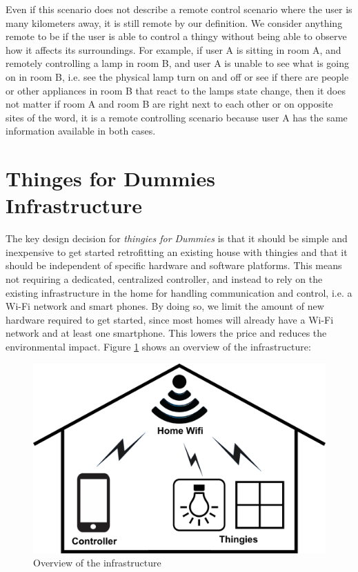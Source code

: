 \documentclass{ubicomp2012}
\begin{document}
Even if this scenario does not describe a remote control scenario where the user is many kilometers away, it is still remote by our definition. We consider anything remote to be if the user is able to control a thingy without being able to observe how it affects its surroundings. For example,  if user A is sitting in room A, and remotely controlling a lamp in room B, and user A is unable to see what is going on in room B, i.e. see the physical lamp turn on and off or see if there are people or other appliances in room B that react to the lamps state change, then it does not matter if room A and room B are right next to each other or on opposite sites of the word, it is a remote controlling scenario because user A has the same information available in both cases.

\section{Thinges for Dummies Infrastructure}
The key design decision for \textit{thingies for Dummies} is that it should be simple and  inexpensive to get started retrofitting an existing house with thingies and that it should be independent of specific hardware and software platforms. This means not requiring a dedicated, centralized controller, and instead to rely on the existing infrastructure in the home for handling communication and control, i.e. a Wi-Fi network and smart phones. By doing so, we limit the amount of new hardware required to get started, since most homes will already have a Wi-Fi network and at least one smartphone. This lowers the price and reduces the environmental impact. Figure \ref{fig:infrastructureOverview} shows an overview of the infrastructure:

\begin{figure}[th]
\begin{center}
\includegraphics[width=0.90\columnwidth]{figures/systemoverviewdrawing.png}
\end{center}
\caption{Overview of the infrastructure}
\label{fig:infrastructureOverview}
\end{figure}
\end{document}
